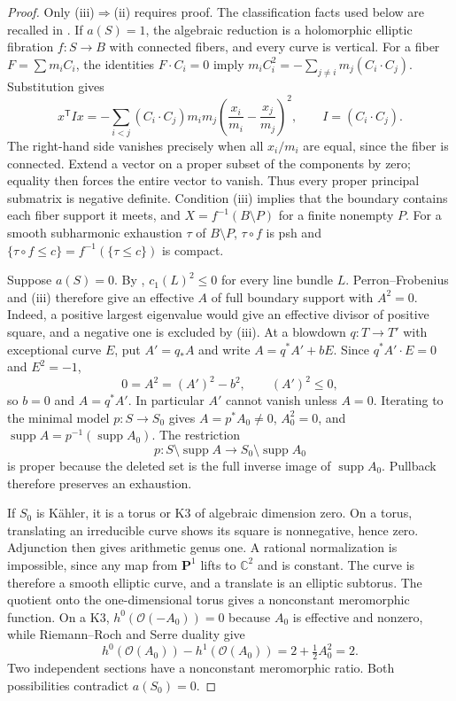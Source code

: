 \documentclass[11pt]{amsart}
\theoremstyle{definition}
\theoremstyle{remark}
\numberwithin{equation}{section}
\newcommand{\C}{\mathbb C}
\newcommand{\PP}{\mathbf P}
\newcommand{\OO}{\mathcal O}
\newcommand{\supp}{\operatorname{supp}}
\begin{document}
\begin{proof}
Only \textup{(iii)}$\Rightarrow$\textup{(ii)} requires proof.
The classification facts used below are recalled in
\cite[\S2]{FN2005}. If $a(S)=1$, the algebraic reduction is a
holomorphic elliptic fibration $f:S\to B$ with connected fibers,
and every curve is vertical. For a fiber $F=\sum m_iC_i$,
the identities $F\cdot C_i=0$ imply
$m_iC_i^2=-\sum_{j\ne i}m_j(C_i\cdot C_j)$. Substitution gives
\begin{equation}\label{eq:surface-fiber-intersection-identity}
 x^{\mathsf T}Ix=-\sum_{i<j}(C_i\cdot C_j)m_im_j
       \left(\frac{x_i}{m_i}-\frac{x_j}{m_j}\right)^2,
 \qquad I=(C_i\cdot C_j).
\end{equation}
The right-hand side vanishes precisely when all $x_i/m_i$ are
equal, since the fiber is connected. Extend a vector on a proper
subset of the components by zero; equality then forces the entire
vector to vanish. Thus every proper principal submatrix is negative
definite. Condition \textup{(iii)} implies that the boundary contains
each fiber support it meets, and
$X=f^{-1}(B\setminus P)$ for a finite nonempty $P$.
For a smooth subharmonic exhaustion $\tau$ of $B\setminus P$,
$\tau\circ f$ is psh and
$\{\tau\circ f\le c\}=f^{-1}(\{\tau\le c\})$ is compact.

Suppose $a(S)=0$. By \cite[Lemma~2.1]{FN2005}, $c_1(L)^2\le0$
for every line bundle $L$. Perron--Frobenius and \textup{(iii)}
therefore give an effective $A$ of full boundary support with
$A^2=0$. Indeed, a positive largest eigenvalue would give an
effective divisor of positive square, and a negative one is excluded
by \textup{(iii)}. At a blowdown $q:T\to T'$ with exceptional curve
$E$, put $A'=q_*A$ and write $A=q^*A'+bE$. Since
$q^*A'\cdot E=0$ and $E^2=-1$,
\[
 0=A^2=(A')^2-b^2,\qquad (A')^2\le0,
\]
so $b=0$ and $A=q^*A'$. In particular $A'$ cannot vanish unless
$A=0$. Iterating to the minimal model $p:S\to S_0$ gives
$A=p^*A_0\ne0$, $A_0^2=0$, and
$\supp A=p^{-1}(\supp A_0)$. The restriction
\[
 p:S\setminus\supp A\longrightarrow S_0\setminus\supp A_0
\]
is proper because the deleted set is the full inverse image of
$\supp A_0$. Pullback therefore preserves an exhaustion.

If $S_0$ is K\"ahler, it is a torus or K3 of algebraic dimension
zero. On a torus, translating an irreducible curve shows its square
is nonnegative, hence zero. Adjunction then gives arithmetic genus
one. A rational normalization is impossible, since any map from
$\PP^1$ lifts to $\C^2$ and is constant. The curve is therefore a
smooth elliptic curve, and a translate is an elliptic subtorus.
The quotient onto the one-dimensional torus gives a nonconstant
meromorphic function. On a K3, $h^0(\OO(-A_0))=0$ because $A_0$
is effective and nonzero, while Riemann--Roch and Serre duality give
\[
 h^0(\OO(A_0))-h^1(\OO(A_0))
 =2+\tfrac12 A_0^2=2.
\]
Two independent sections have a nonconstant meromorphic ratio.
Both possibilities contradict $a(S_0)=0$.


\end{proof}
\end{document}
